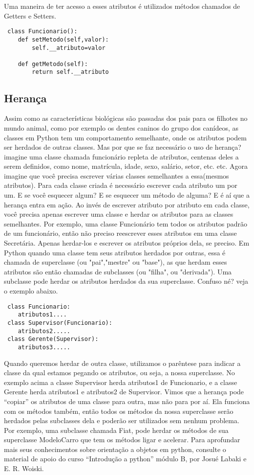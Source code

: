 \documentclass[11pt,a4paper]{article}
\begin{document}
Uma maneira de ter acesso a esses atributos é utilizados métodos chamados de Getters e Setters.

\begin{lstlisting}
 class Funcionario():
	def setMetodo(self,valor):
		self.__atributo=valor

	def getMetodo(self):
		return self.__atributo
\end{lstlisting}

\subsection{Herança}
Assim como as características biológicas são passadas dos pais para os filhotes no mundo
animal, como por exemplo os dentes caninos do grupo dos canídeos, as classes em Python
tem um comportamento semelhante, onde os atributos podem ser herdados de outras
classes.
Mas por que se faz necessário o uso de herança? imagine uma classe chamada funcionário
repleta de atributos, centenas deles a serem definidos, como nome, matrícula, idade, sexo,
salário, setor, etc. etc. Agora imagine que você precisa escrever várias classes semelhantes
a essa(mesmos atributos). Para cada classe criada é necessário escrever cada atributo um
por um. E se você esquecer algum? E se esquecer um método de alguma? E é aí que a
herança entra em ação.
Ao invés de escrever atributo por atributo em cada classe, você precisa apenas escrever
uma classe e herdar os atributos para as classes semelhantes. Por exemplo, uma classe
Funcionário tem todos os atributos padrão de um funcionário, então não preciso reescrever
esses atributos em uma classe Secretária. Apenas herdar-los e escrever os atributos
próprios dela, se preciso.
Em Python quando uma classe tem seus atributos herdados por outras, essa é chamada de
superclasse (ou "pai","mestre" ou "base"), as que herdam esses atributos são então
chamadas de subclasses (ou "filha", ou "derivada"). Uma subclasse pode herdar os
atributos herdados da sua superclasse. Confuso né? veja o exemplo abaixo.
\begin{lstlisting}
 class Funcionario:
	atributos1....
 class Supervisor(Funcionario):
	atributos2.....
 class Gerente(Supervisor):
	atributos3.....
\end{lstlisting}
Quando queremos herdar de outra classe, utilizamos o parêntese para indicar a classe da
qual estamos pegando os atributos, ou seja, a nossa superclasse. No exemplo acima a
classe Supervisor herda atributos1 de Funcionario, e a classe Gerente herda atributos1 e
atributos2 de Supervisor.
Vimos que a herança pode “copiar” os atributos de uma classe para outra, mas não para por
aí. Ela funciona com os métodos também, então todos os métodos da nossa superclasse
serão herdados pelas subclasses dela e poderão ser utilizados sem nenhum problema. Por
exemplo, uma subclasse chamada Fiat, pode herdar os métodos de sua superclasse
ModeloCarro que tem os métodos ligar e acelerar.
Para aprofundar mais seus conhecimentos sobre orientação a objetos em python, consulte
o material de apoio do curso “Introdução a python” módulo B, por Josué Labaki e E. R.
Woiski.
\end{document}
